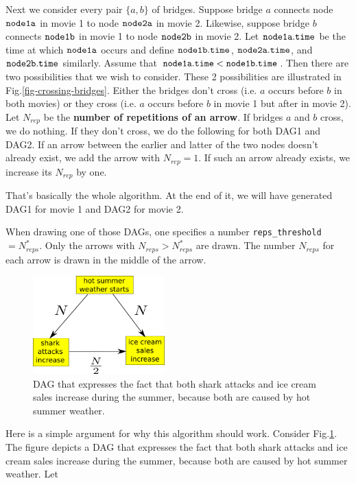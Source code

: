 \documentclass[12pt]{article}
\begin{document}
Next we consider every  pair $\{a,b\}$
of bridges. Suppose bridge  $a$ 
connects node $\tt node1a$ in movie 1
to node $\tt node2a$ in movie 2.
Likewise, suppose bridge $b$ connects
$\tt node1b$ in movie 1 to
node $\tt node2b$ in movie 2.
Let $\tt node1a.time$ be the time at which 
$\tt node1a$ occurs and define
$\tt node1b.time$,
$\tt node2a.time$, and
$\tt node2b.time$ similarly.
Assume that
$\tt
node1a.time< node1b.time$.
Then there are two possibilities
that we wish to consider. These 2 possibilities are illustrated in Fig.\ref{fig-crossing-bridges}.
Either the bridges don't cross 
(i.e. $a$ occurs before $b$ in both movies)
or they cross (i.e. $a$ occurs before $b$
in movie 1 but after in movie 2).
Let $N_{rep}$ be the {\bf number
of repetitions of an arrow}.
If bridges $a$ and $b$ cross,
we do nothing. If they don't cross,
we do the following for both DAG1 and DAG2.
If an arrow between the earlier and latter of the two nodes doesn't already
exist, we add the arrow with $N_{rep}=1$.
If such an arrow already exists,
we increase its $N_{rep}$ by one.

That's basically the whole algorithm.
At the end of it, we will have
generated DAG1 for movie 1 and DAG2 for movie 2.

When drawing one of those DAGs,
one specifies a number {\tt reps\_threshold}$=N_{reps}^*$.
Only the arrows with $N_{reps}> N^*_{reps}$
are drawn.
The number $N_{reps}$ for each arrow is drawn
in the middle of the arrow.




\begin{figure}[h!]
\centering
\includegraphics[width=2in]
{shark-attacks.png}
\caption{
DAG that expresses the fact that both
shark attacks and ice
cream sales increase during the summer,
because both are caused by hot summer weather.
}
\label{fig-shark-attacks}
\end{figure}

Here is a simple argument for
why this algorithm should work.
Consider Fig.\ref{fig-shark-attacks}.
The figure depicts a DAG that
expresses the fact that both
shark attacks and ice
cream sales increase during the summer,
because both are caused by hot summer weather.
Let 
\end{document}
